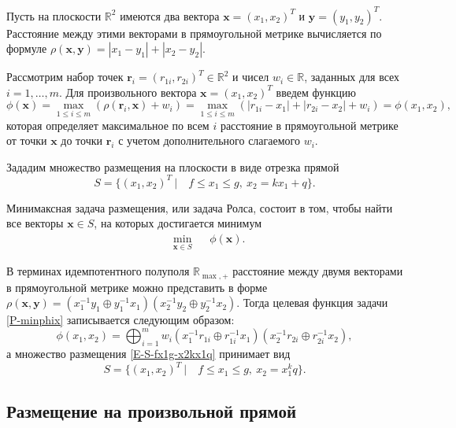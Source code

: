 \documentclass{spisok-article}
\begin{document}
Пусть на плоскости $\mathbb{R}^{2}$ имеются два вектора $\bm{x}=(x_{1},x_{2})^{T}$ и $\bm{y}=(y_{1},y_{2})^{T}$. Расстояние между этими векторами в прямоугольной метрике вычисляется по формуле
$
\rho(\bm{x},\bm{y})
=
|x_{1}-y_{1}|+|x_{2}-y_{2}|.
$

Рассмотрим набор точек $\bm{r}_{i}=(r_{1i},r_{2i})^{T}\in\mathbb{R}^{2}$ и чисел $w_{i}\in\mathbb{R}$, заданных для всех $i=1,\ldots,m$. Для произвольного вектора $\bm{x}=(x_{1},x_{2})^{T}$ введем функцию
$$
\phi(\bm{x})
=
\max_{1\leq i \leq m}(\rho(\bm{r}_{i},\bm{x})+w_{i})
=
\max_{1\leq i \leq m}(|r_{1i}-x_{1}|+|r_{2i}-x_{2}|+w_{i})
=
\phi(x_{1},x_{2}),
$$
которая определяет максимальное по всем $i$ расстояние в прямоугольной метрике от точки $\bm{x}$ до точки $\bm{r}_{i}$ с учетом дополнительного слагаемого $w_{i}$.

Зададим множество размещения на плоскости в виде отрезка прямой
\begin{equation}
S
=
\{(x_{1},x_{2})^{T}\ | \quad f\leq x_{1}\leq g,\ x_{2}=kx_{1}+q\}.
\label{E-S-fx1g-x2kx1q}
\end{equation}

Минимаксная задача размещения, или задача Ролса, состоит в том, чтобы найти все векторы $\bm{x} \in S$, на которых достигается минимум
\begin{equation}
\begin{aligned}
&
\min_{\bm{x}\in S}
&&
\phi(\bm{x}).
\end{aligned}
\label{P-minphix}
\end{equation}

В терминах идемпотентного полуполя $\mathbb{R}_{\max,+}$ расстояние между двумя векторами в прямоугольной метрике можно представить в форме
$
\rho(\bm{x},\bm{y})
=
(x_{1}^{-1}y_{1}\oplus y_{1}^{-1}x_{1})
(x_{2}^{-1}y_{2}\oplus y_{2}^{-1}x_{2}).
$
Тогда целевая функция задачи \eqref{P-minphix} записывается следующим образом:
\begin{equation*}
\phi(x_{1},x_{2})
=
\bigoplus_{i=1}^{m}w_{i}
(x_{1}^{-1}r_{1i}\oplus r_{1i}^{-1}x_{1})
(x_{2}^{-1}r_{2i}\oplus r_{2i}^{-1}x_{2}),
\end{equation*}
а множество размещения \eqref{E-S-fx1g-x2kx1q} принимает вид
\begin{equation*}
S
=
\{(x_{1},x_{2})^{T}\ | \quad f\leq x_{1}\leq g,\ x_{2}=x_{1}^k q\}.
\end{equation*}

\subsection{Размещение на произвольной прямой}
\end{document}
